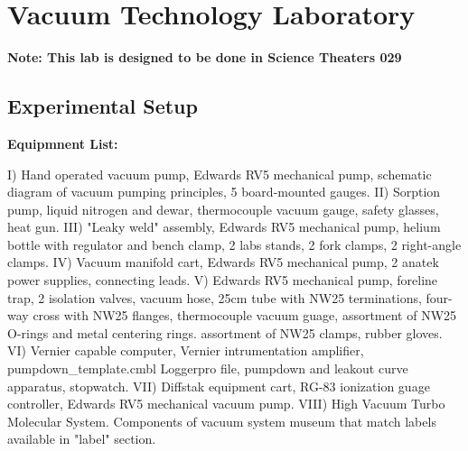\documentclass{book}
\begin{document}


\section{Vacuum Technology Laboratory}

{\bf Note: This lab is designed to be done in Science Theaters 029}\newline


\subsection{Experimental Setup}

{\bf Equipmnent List:}

I)    Hand operated vacuum pump, Edwards RV5 mechanical pump, schematic diagram of vacuum pumping principles, 5 board-mounted gauges.\newline
II)   Sorption pump, liquid nitrogen and dewar, thermocouple vacuum gauge, safety glasses, heat gun.\newline
III)  "Leaky weld" assembly, Edwards RV5 mechanical pump, helium bottle with regulator and bench clamp, 2 labs stands, 2 fork clamps, 2 right-angle clamps.\newline
IV)   Vacuum manifold cart, Edwards RV5 mechanical pump, 2 anatek power supplies, connecting leads.\newline
V)    Edwards RV5 mechanical pump, foreline trap, 2 isolation valves, vacuum hose, 25cm tube with NW25 terminations, four-way cross with NW25 flanges, thermocouple vacuum guage, assortment of NW25 O-rings and metal centering rings. assortment of NW25 clamps, rubber gloves.\newline
VI)   Vernier capable computer, Vernier intrumentation amplifier, pumpdown_template.cmbl Loggerpro file, pumpdown and leakout curve apparatus, stopwatch.\newline
VII)  Diffstak equipment cart, RG-83 ionization guage controller, Edwards RV5 mechanical vacuum pump.
VIII) High Vacuum Turbo Molecular System.\newline
Components of vacuum system museum that match labels available in "label" section.\newline

\end{document}
